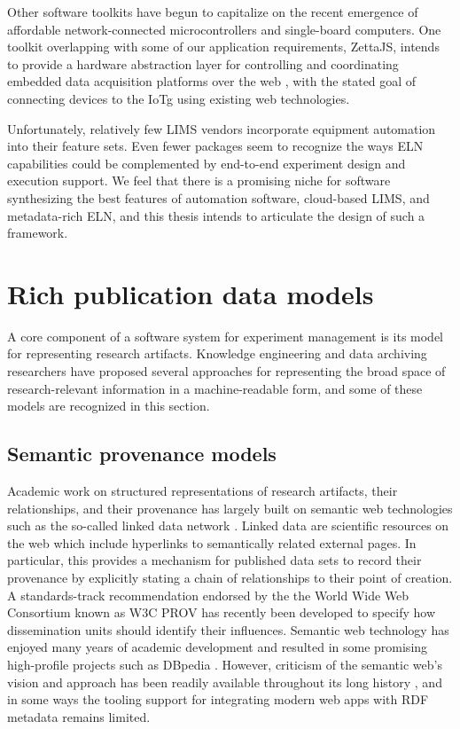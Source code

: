 \documentclass[../thesis]{subfiles}
\begin{document}
Other software toolkits have begun to capitalize on
the recent emergence of affordable network-connected microcontrollers
and single-board computers. One toolkit overlapping with some
of our application requirements, ZettaJS, intends to provide a
hardware abstraction layer for controlling and coordinating embedded
data acquisition platforms over the web \cite{ZettaJS}, with the
stated goal of connecting devices to the \gls{IoTg} using existing web
technologies.

Unfortunately, relatively few \gls{LIMS} vendors incorporate equipment
automation into their feature sets. Even fewer packages seem to
recognize the ways \gls{ELN} capabilities could be complemented by
end-to-end experiment design and execution support. We feel that there
is a promising niche for software synthesizing the best features of
automation software, cloud-based \gls{LIMS}, and metadata-rich
\gls{ELN}, and this thesis intends to articulate the design of such a
framework.



\section{Rich publication data models}
A core component of a software system for experiment management is its
model for representing research \glspl{artifact}. Knowledge
engineering and data archiving researchers have proposed several
approaches for representing the broad space of research-relevant
information in a machine-readable form, and some of these models are
recognized in this section.

\subsection{Semantic provenance models}
Academic work on structured representations of research artifacts,
their relationships, and their provenance has largely built on
semantic web technologies such as the so-called linked data network
\cite{LinkedData}. Linked data are scientific resources on the
web which include hyperlinks to semantically related external pages. In
particular, this provides a mechanism for published data sets to
record their provenance by explicitly stating a chain of relationships
to their point of creation. A standards-track recommendation endorsed
by the the World Wide Web Consortium known as W3C PROV \cite{PROV} has
recently been developed to specify how dissemination units should
identify their influences. Semantic web technology has enjoyed many
years of academic development and resulted in some promising
high-profile projects such as DBpedia \cite{DBpedia}. However,
criticism of the semantic web's vision and approach has been readily
available throughout its long history
\cite{Marshall:2003:SW:900051.900063}, and in some ways the tooling
support for integrating modern web apps with \gls{RDF}
metadata remains limited.
\end{document}
